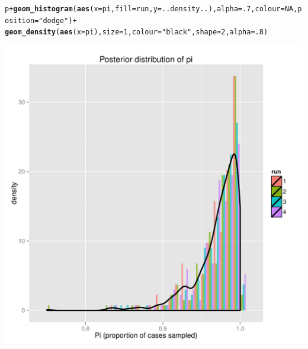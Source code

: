 \documentclass{article}\usepackage[]{graphicx}\usepackage[]{color}
\makeatletter
\newcommand{\hlnum}[1]{\textcolor[rgb]{0.686,0.059,0.569}{#1}}%
\newcommand{\hlstr}[1]{\textcolor[rgb]{0.192,0.494,0.8}{#1}}%
\newcommand{\hlopt}[1]{\textcolor[rgb]{0,0,0}{#1}}%
\newcommand{\hlstd}[1]{\textcolor[rgb]{0.345,0.345,0.345}{#1}}%
\newcommand{\hlkwc}[1]{\textcolor[rgb]{0.333,0.667,0.333}{#1}}%
\newcommand{\hlkwd}[1]{\textcolor[rgb]{0.737,0.353,0.396}{\textbf{#1}}}%
\newenvironment{kframe}{%
 \def\at@end@of@kframe{}%
 \ifinner\ifhmode%
  \def\at@end@of@kframe{\end{minipage}}%
  \begin{minipage}{\columnwidth}%
 \fi\fi%
 \def\FrameCommand##1{\hskip\@totalleftmargin \hskip-\fboxsep
 \colorbox{shadecolor}{##1}\hskip-\fboxsep
     \hskip-\linewidth \hskip-\@totalleftmargin \hskip\columnwidth}%
 \MakeFramed {\advance\hsize-\width
   \@totalleftmargin\z@ \linewidth\hsize
   \@setminipage}}%
 {\par\unskip\endMakeFramed%
 \at@end@of@kframe}
\newenvironment{knitrout}{}{} %
\makeatother
\begin{document}
\begin{knitrout}
\color{fgcolor}\begin{kframe}
\begin{alltt}
\hlstd{p} \hlopt{+} \hlkwd{geom_histogram}\hlstd{(}\hlkwd{aes}\hlstd{(}\hlkwc{x}\hlstd{=pi,} \hlkwc{fill}\hlstd{=run,} \hlkwc{y}\hlstd{=..density..),} \hlkwc{alpha}\hlstd{=}\hlnum{.7}\hlstd{,} \hlkwc{colour}\hlstd{=}\hlnum{NA}\hlstd{,} \hlkwc{position}\hlstd{=}\hlstr{"dodge"}\hlstd{)} \hlopt{+}
    \hlkwd{geom_density}\hlstd{(}\hlkwd{aes}\hlstd{(}\hlkwc{x}\hlstd{=pi),} \hlkwc{size}\hlstd{=}\hlnum{1}\hlstd{,} \hlkwc{colour}\hlstd{=}\hlstr{"black"}\hlstd{,} \hlkwc{shape}\hlstd{=}\hlnum{2}\hlstd{,} \hlkwc{alpha}\hlstd{=}\hlnum{.8}\hlstd{)}
\end{alltt}


{\ttfamily\noindent\itshape\color{messagecolor}{\#\# stat\_bin: binwidth defaulted to range/30. Use 'binwidth = x' to adjust this.}}\end{kframe}

{\centering \includegraphics[width=.6\textwidth]{figs/unnamed-chunk-34} 

}



\end{knitrout}
\end{document}
